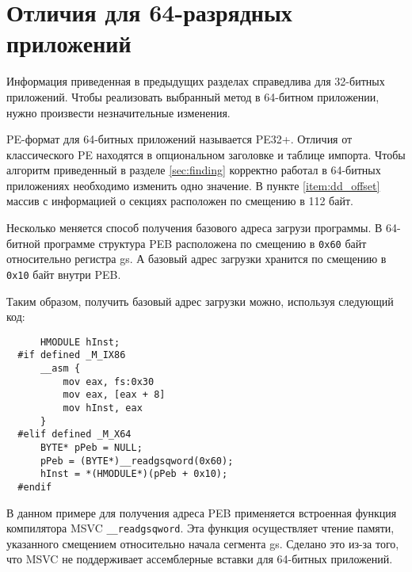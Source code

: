 \section{Отличия для 64-разрядных приложений}
Информация приведенная в предыдущих разделах справедлива для 32-битных
приложений. Чтобы реализовать выбранный метод в 64-битном приложении, нужно
произвести незначительные изменения.

PE-формат для 64-битных приложений называется PE32+. Отличия от классического PE
находятся в опциональном заголовке и таблице импорта. Чтобы алгоритм приведенный
в разделе \ref{sec:finding} корректно работал в 64-битных приложениях необходимо
изменить одно значение. В пункте \ref{item:dd_offset} массив с информацией о
секциях расположен по смещению в 112 байт. 

Несколько меняется способ получения базового адреса загрузи программы. В
64-битной программе структура PEB расположена по смещению в \verb!0x60! байт
относительно регистра gs. А базовый адрес загрузки хранится по смещению в
\verb!0x10! байт внутри PEB. 

Таким образом, получить базовый адрес загрузки можно, используя следующий код:
\begin{verbatim}
      HMODULE hInst;
  #if defined _M_IX86
      __asm {
          mov eax, fs:0x30
          mov eax, [eax + 8]
          mov hInst, eax
      }
  #elif defined _M_X64
      BYTE* pPeb = NULL;
      pPeb = (BYTE*)__readgsqword(0x60);
      hInst = *(HMODULE*)(pPeb + 0x10);
  #endif
\end{verbatim}

В данном примере для получения адреса PEB применяется встроенная
функция компилятора MSVC \verb!__readgsqword!. Эта функция осуществляет чтение
памяти, указанного смещением относительно начала сегмента gs. Сделано это из-за
того, что MSVC не поддерживает ассемблерные вставки для 64-битных приложений.
